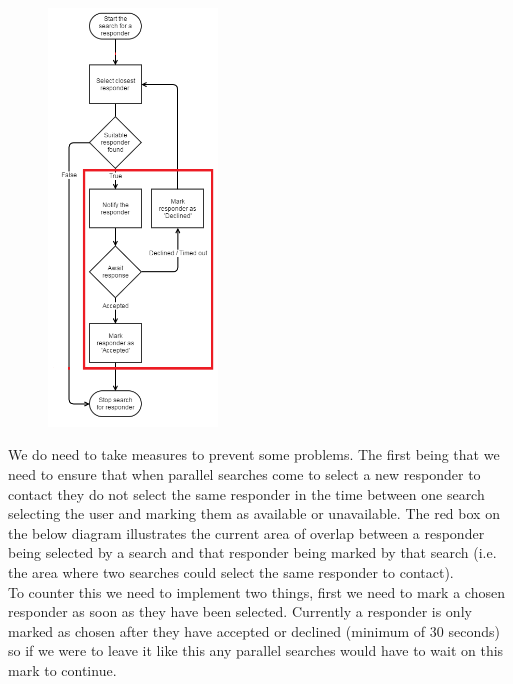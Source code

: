 \documentclass{article}
\begin{document}
\begin{figure}
  \begin{center}
    \includegraphics[width=0.4\textwidth]{"Iteration3/parallelization_of_search (3) (1)"}
  \end{center}
\end{figure}
We do need to take measures to prevent some problems. The first being that we need to ensure that when parallel searches come to select a new responder to contact they do not select the same responder in the time between one search selecting the user and marking them as available or unavailable. The red box on the below diagram illustrates the current area of overlap between a responder being selected by a search and that responder being marked by that search (i.e. the area where two searches could select the same responder to contact).\\

To counter this we need to implement two things, first we need to mark a chosen responder as soon as they have been selected. Currently a responder is only marked as chosen after they have accepted or declined (minimum of 30 seconds) so if we were to leave it like this any parallel searches would have to wait on this mark to continue.\\
\end{document}
